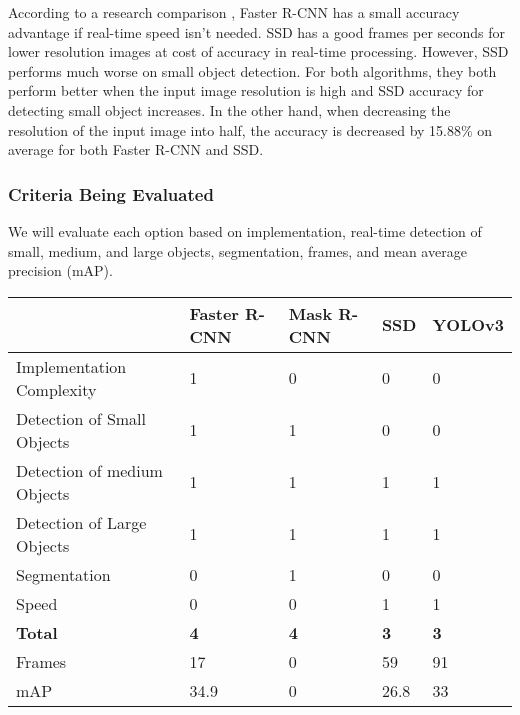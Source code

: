 According to a research comparison \cite{pda1}, Faster R-CNN has a small accuracy advantage if real-time speed isn't needed. SSD has a good frames per seconds for lower resolution images at cost of accuracy in real-time processing. However, SSD performs much worse on small object detection. For both algorithms, they both perform better when the input image resolution is high and SSD accuracy for detecting small object increases. In the other hand, when decreasing the resolution of the input image into half, the accuracy is decreased by 15.88\% on average for both Faster R-CNN and SSD.

\subsubsection{Criteria Being Evaluated}
We will evaluate each option based on implementation, real-time detection of small, medium, and large objects, segmentation, frames, and mean average precision (mAP).

\begin{center}
\begin{tabular}{|l|l|l|l|l|}
\hline
           & \textbf{Faster R-CNN} & \textbf{Mask R-CNN} & \textbf{SSD} & \textbf{YOLOv3} \\ \hline
Implementation Complexity &      1     &     0 &     0            &     0      \\ \hline
Detection of Small Objects &     1     &     1 &     0       &    0       \\ \hline
Detection of medium Objects &     1     &     1 &     1       &    1       \\ \hline
Detection of Large Objects &      1     &     1 &     1     &     1      \\ \hline
Segmentation &      0     &     1 &     0     &     0      \\ \hline
Speed &     0      &     0 &      1     &      1    \\ \hline
\textbf{Total} &      \textbf{4}     &     \textbf{4} &   \textbf{3}        &      \textbf{3}     \\ \hline
Frames &     17      &     0 &      59     &      91    \\ \hline
mAP &     34.9     &     0 &     26.8      &      33       \\
\hline
\end{tabular}
\end{center}

